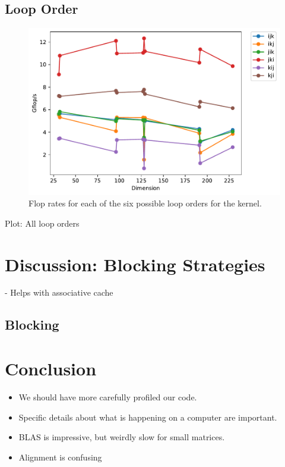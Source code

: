 \documentclass{article}
\begin{document}
\subsection{Loop Order}
\begin{figure}
    \centering
    \includegraphics[width=0.8\columnwidth]{LoopOrder.pdf}
    \caption{Flop rates for each of the six possible loop orders for the kernel.}
    \label{fig:LoopOrder}
\end{figure}

Plot: All loop orders


\section{Discussion: Blocking Strategies}
- Helps with associative cache
\subsection{Blocking}










\section{Conclusion}
\begin{itemize}
	\item We should have more carefully profiled our code. 
	\item Specific details about what is happening on a computer are important.
	\item BLAS is impressive, but weirdly slow for small matrices.
	\item Alignment is confusing
\end{itemize}
\end{document}
